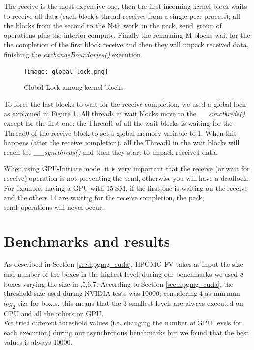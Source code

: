 \documentclass[conference]{IEEEtran}
\begin{document}
The receive is the most expensive one, then the first incoming kernel block waits to receive all data (each block's thread receives from a single peer process); all the blocks from the second to the N-th work on the \lbrack pack, send\rbrack \ group of operations plus the \lbrack interior compute\rbrack. Finally the remaining M blocks wait for the the completion of the first block receive and then they will unpack received data, finishing the \textit{exchangeBoundaries()} execution.

\begin{figure}[h]
\texttt{[image: global\_lock.png]}
\caption{Global Lock among kernel blocks}
\label{fig:global_lock}
\end{figure}

To force the last blocks to wait for the receive completion, we used a global lock as explained in Figure \ref{fig:global_lock}. All threads in wait blocks move to the \textit{\_\_syncthreds()} except for the first one: the Thread0 of all the wait blocks is waiting for the Thread0 of the receive block to set a global memory variable to 1. When this happens (after the receive completion), all the Thread0 in the wait blocks will reach the \textit{\_\_syncthreds()} and then they start to unpack received data.

When using GPU-Initiate mode, it is very important that the receive (or wait for receive) operation is not preventing the send, otherwise you will have a deadlock.
For example, having a GPU with 15 SM, if the first one is waiting on the receive and the others 14 are waiting for the receive completion, the \lbrack pack, send\rbrack \ operations will never occur.

\section{Benchmarks and results}

As described in Section \ref{sec:hpgmg_cuda}, HPGMG-FV takes as input the size and number of the boxes in the highest level; during our benchmarks we used 8 boxes varying the size in ,5,6,7\rbrack.
According to Section \ref{sec:hpgmg_cuda}, the threshold size used during NVIDIA tests was 10000; considering 4 as minimun $log_2$ size for boxes, this means that the 3 smallest levels are always executed on CPU and all the others on GPU.\\
We tried different threshold values (i.e. changing the number of GPU levels for each execution) during our asynchronous benchmarks but we found that the best values is always 10000.
\end{document}
